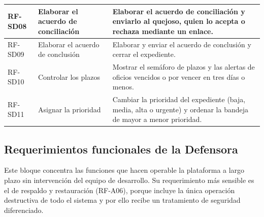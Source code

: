 \begin{longtable}{|L{1.7cm}|L{4.0cm}|L{9.9cm}|}
		RF-SD08 & Elaborar el acuerdo de conciliación & Elaborar el acuerdo de conciliación y enviarlo
		al quejoso, quien lo acepta o rechaza mediante un enlace. \\ \hline

		RF-SD09 & Elaborar el acuerdo de conclusión & Elaborar y enviar el acuerdo de conclusión y
		cerrar el expediente. \\ \hline

		RF-SD10 & Controlar los plazos & Mostrar el semáforo de plazos y las alertas de oficios
		vencidos o por vencer en tres días o menos. \\ \hline

		RF-SD11 & Asignar la prioridad & Cambiar la prioridad del expediente (baja, media, alta o
		urgente) y ordenar la bandeja de mayor a menor prioridad. \\ \hline
	\end{longtable}

	\normalsize

	\subsection{Requerimientos funcionales de la Defensora}
	Este bloque concentra las funciones que hacen operable la plataforma a largo plazo sin
	intervención del equipo de desarrollo. Su requerimiento más sensible es el de respaldo y
	restauración (RF-A06), porque incluye la única operación destructiva de todo el sistema y por
	ello recibe un tratamiento de seguridad diferenciado.
	
	\small
	\renewcommand{\arraystretch}{1.2}
	
